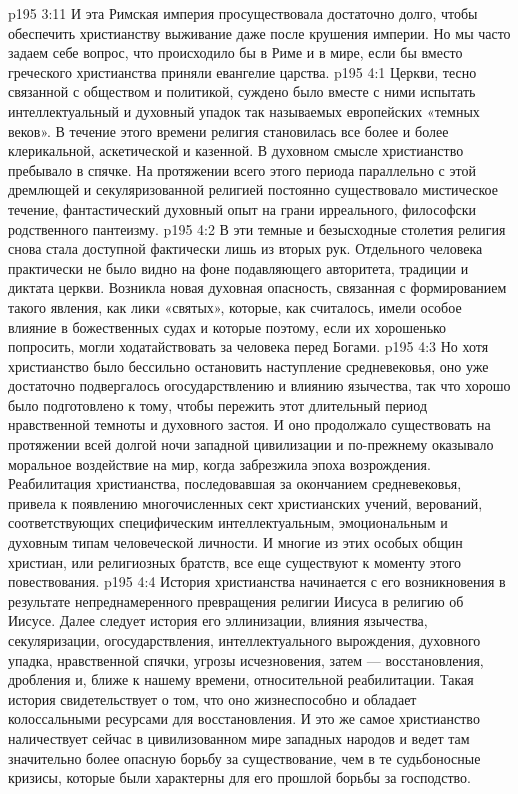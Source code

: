 \vs p195 3:11 И эта Римская империя просуществовала достаточно долго, чтобы обеспечить христианству выживание даже после крушения империи. Но мы часто задаем себе вопрос, что происходило бы в Риме и в мире, если бы вместо греческого христианства приняли евангелие царства.
\vs p195 4:1 Церкви, тесно связанной с обществом и политикой, суждено было вместе с ними испытать интеллектуальный и духовный упадок так называемых европейских «темных веков». В течение этого времени религия становилась все более и более клерикальной, аскетической и казенной. В духовном смысле христианство пребывало в спячке. На протяжении всего этого периода параллельно с этой дремлющей и секуляризованной религией постоянно существовало мистическое течение, фантастический духовный опыт на грани ирреального, философски родственного пантеизму.
\vs p195 4:2 В эти темные и безысходные столетия религия снова стала доступной фактически лишь из вторых рук. Отдельного человека практически не было видно на фоне подавляющего авторитета, традиции и диктата церкви. Возникла новая духовная опасность, связанная с формированием такого явления, как лики «святых», которые, как считалось, имели особое влияние в божественных судах и которые поэтому, если их хорошенько попросить, могли ходатайствовать за человека перед Богами.
\vs p195 4:3 Но хотя христианство было бессильно остановить наступление средневековья, оно уже достаточно подвергалось огосударствлению и влиянию язычества, так что хорошо было подготовлено к тому, чтобы пережить этот длительный период нравственной темноты и духовного застоя. И оно продолжало существовать на протяжении всей долгой ночи западной цивилизации и по\hyp{}прежнему оказывало моральное воздействие на мир, когда забрезжила эпоха возрождения. Реабилитация христианства, последовавшая за окончанием средневековья, привела к появлению многочисленных сект христианских учений, верований, соответствующих специфическим интеллектуальным, эмоциональным и духовным типам человеческой личности. И многие из этих особых общин христиан, или религиозных братств, все еще существуют к моменту этого повествования.
\vs p195 4:4 \pc История христианства начинается с его возникновения в результате непреднамеренного превращения религии Иисуса в религию об Иисусе. Далее следует история его эллинизации, влияния язычества, секуляризации, огосударствления, интеллектуального вырождения, духовного упадка, нравственной спячки, угрозы исчезновения, затем --- восстановления, дробления и, ближе к нашему времени, относительной реабилитации. Такая история свидетельствует о том, что оно жизнеспособно и обладает колоссальными ресурсами для восстановления. И это же самое христианство наличествует сейчас в цивилизованном мире западных народов и ведет там значительно более опасную борьбу за существование, чем в те судьбоносные кризисы, которые были характерны для его прошлой борьбы за господство.
